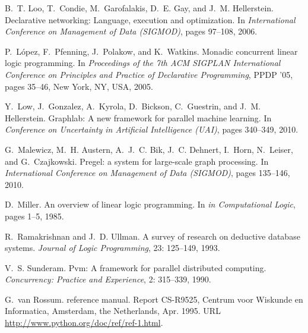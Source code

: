 \documentclass{sigplanconf}
\begin{document}
\begin{thebibliography}{35}
B.~T. Loo, T.~Condie, M.~Garofalakis, D.~E. Gay, and J.~M. Hellerstein.
\newblock Declarative networking: Language, execution and optimization.
\newblock In \emph{International Conference on Management of Data (SIGMOD)},
  pages 97--108, 2006.

P.~L\'{o}pez, F.~Pfenning, J.~Polakow, and K.~Watkins.
\newblock Monadic concurrent linear logic programming.
\newblock In \emph{Proceedings of the 7th ACM SIGPLAN International Conference
  on Principles and Practice of Declarative Programming}, PPDP '05, pages
  35--46, New York, NY, USA, 2005.

Y.~Low, J.~Gonzalez, A.~Kyrola, D.~Bickson, C.~Guestrin, and J.~M. Hellerstein.
\newblock Graphlab: {A} new framework for parallel machine learning.
\newblock In \emph{Conference on Uncertainty in Artificial Intelligence (UAI)},
  pages 340--349, 2010.

G.~Malewicz, M.~H. Austern, A.~J.~C. Bik, J.~C. Dehnert, I.~Horn, N.~Leiser,
  and G.~Czajkowski.
\newblock Pregel: a system for large-scale graph processing.
\newblock In \emph{International Conference on Management of Data (SIGMOD)},
  pages 135--146, 2010.

D.~Miller.
\newblock An overview of linear logic programming.
\newblock In \emph{in Computational Logic}, pages 1--5, 1985.

R.~Ramakrishnan and J.~D. Ullman.
\newblock A survey of research on deductive database systems.
\newblock \emph{Journal of Logic Programming}, 23: 125--149, 1993.

V.~S. Sunderam.
\newblock Pvm: A framework for parallel distributed computing.
\newblock \emph{Concurrency: Practice and Experience}, 2: 315--339,
  1990.

G.~{van Rossum}.
 reference manual.
\newblock Report CS-R9525, Centrum voor Wiskunde en Informatica, Amsterdam, the
  Netherlands, Apr. 1995.
\newblock URL \url{http://www.python.org/doc/ref/ref-1.html}.


\end{thebibliography}
\end{document}
